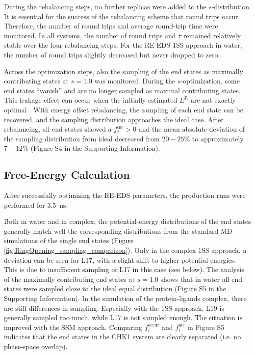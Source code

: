 During the rebalancing steps, no further replicas were added to the $s$-distribution. It is essential for the success of the rebalancing scheme that round trips occur. Therefore, the number of round trips and average round-trip time were monitored. In all systems, the number of round trips and $\overline{\tau}$ remained relatively stable over the four rebalancing steps. For the RE-EDS 1SS approach in water, the number of round trips slightly decreased but never dropped to zero.

Across the optimization steps, also the sampling of the end states as maximally contributing states at $s=1.0$ was monitored.
During the $s$-optimization, some end states ``vanish'' and are no longer sampled as maximal contributing states. This leakage effect can occur when the initially estimated $E^{\text{R}}$ are not exactly optimal \cite{Sidler2016}. 
With energy offset rebalancing, the sampling of each end state can be recovered, and the sampling distribution approaches the ideal case.
After rebalancing, all end states showed a $f_i^{\text{mc}} > 0$ and the mean absolute deviation of the sampling distribution from ideal decreased from $20-25\%$ to approximately $7-12\%$ (Figure S4 in the Supporting Information). %
 
\subsection{Free-Energy Calculation}
After successfully optimizing the RE-EDS parameters, the production runs were performed for $3.5$~ns. 

Both in water and in complex, the potential-energy distributions of the end states generally match well the corresponding distributions from the standard MD simulations of the single end states (Figure \ref{fig:RingOpening_sampling_comparison}). Only in the complex 1SS approach, a deviation can be seen for L17, with a slight shift to higher potential energies. This is due to insufficient sampling of L17 in this case (see below). 
%
The analysis of the maximally contributing end states at $s=1.0$ shows that in water all end states were sampled close to the ideal equal distribution (Figure S5 in the Supporting Information). %
In the simulation of the protein-ligands complex, there are still differences in sampling. Especially with the 1SS approach, L19 is generally sampled too much, while L17 is not sampled enough. The situation is improved with the SSM approach.
Comparing $f_i^{\text{occur}}$ and $f_i^{\text{mc}}$ in Figure S5 indicates that the end states in the CHK1 system are clearly separated (i.e. no phase-space overlap). %

